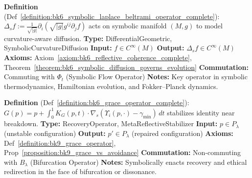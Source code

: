 \begin{description}[leftmargin=2.5cm, style=nextline]
\item[\textbf{Symbolic Laplace--Beltrami Operator} \hfill \ensuremath{\Delta_s}] 
\label{dict:appA_symbolic_laplace_beltrami_operator}
\textbf{Definition} (Def~\ref{definition:bk6_symbolic_laplace_beltrami_operator_complete}): \( \Delta_s f := \frac{1}{\sqrt{|g|}} \partial_i (\sqrt{|g|} g^{ij} \partial_j f) \) acts on symbolic manifold \( (M, g) \) to model curvature-aware diffusion.
\textbf{Type:} DifferentialGeometric, SymbolicCurvatureDiffusion
\textbf{Input:} \( f \in C^{\infty}(M) \)
\textbf{Output:} \( \Delta_s f \in C^{\infty}(M) \)
\textbf{Axioms:} Axiom~\ref{axiom:bk6_reflective_coherence_complete}, Theorem~\ref{theorem:bk6_symbolic_diffusion_governs_evolution}
\textbf{Commutation:} Commuting with \( \Phi_t \) (Symbolic Flow Operator)
\textbf{Notes:} Key operator in symbolic thermodynamics, Hamiltonian evolution, and Fokker–Planck dynamics.

\item[\textbf{Grace Operator} \hfill \ensuremath{G}] 
\label{dict:appA_grace_operator}
\textbf{Definition} (Def~\ref{definition:bk6_grace_operator_complete}): \( G(p) = p + \int_0^1 K_G(p, t) \cdot \nabla_s (\Upsilon_i(p, \cdot) - \gamma_{\min}) \, dt \) stabilizes identity near breakdown.
\textbf{Type:} RecoveryOperator, MetaReflectiveStabilizer
\textbf{Input:} \( p \in P_\lambda \) (unstable configuration)
\textbf{Output:} \( p' \in P_\lambda \) (repaired configuration)
\textbf{Axioms:} Def~\ref{definition:bk9_grace_operator}, Prop~\ref{proposition:bk9_grace_vs_avoidance}
\textbf{Commutation:} Non-commuting with \( B_\lambda \) (Bifurcation Operator)
\textbf{Notes:} Symbolically enacts recovery and ethical redirection in the face of bifurcation or dissonance.

\end{description}
